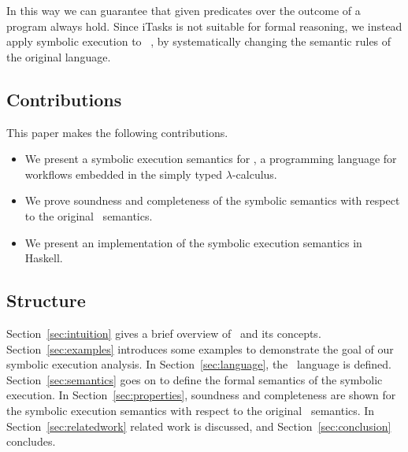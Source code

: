 In this way we can guarantee that given predicates over the outcome of a \TOP program always hold.
Since iTasks is not suitable for formal reasoning, we instead apply symbolic execution to \TOPHAT~\cite{DBLP:conf/ppdp/SteenvoordenNK19}, by systematically changing the semantic rules of the original language.



\subsection{Contributions}

This paper makes the following contributions.

\begin{itemize}
  \item We present a symbolic execution semantics for \TOPHAT, a programming language for workflows embedded in the simply typed $\lambda$-calculus.
  \item We prove soundness and completeness of the symbolic semantics with respect to the original \TOPHAT\ semantics.
  \item We present an implementation of the symbolic execution semantics in Haskell.
\end{itemize}



\subsection{Structure}

Section~\ref{sec:intuition} gives a brief overview of \TOPHAT\ and its concepts.
Section~\ref{sec:examples} introduces some examples to demonstrate the goal of our symbolic execution analysis.
In Section~\ref{sec:language}, the \TOPHAT\ language is defined.
Section~\ref{sec:semantics} goes on to define the formal semantics of the symbolic execution.
In Section~\ref{sec:properties}, soundness and completeness are shown for the symbolic execution semantics with respect to the original \TOPHAT\ semantics.
In Section~\ref{sec:relatedwork} related work is discussed, and Section~\ref{sec:conclusion} concludes.
